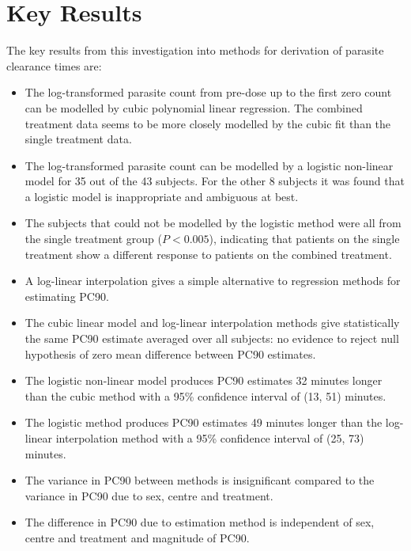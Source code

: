 \section{Key Results}
The key results from this investigation into methods for derivation of parasite clearance times are:
\begin{itemize}
\item The log-transformed parasite count from pre-dose up to the first zero count can be modelled by cubic polynomial linear regression. The combined treatment data seems to be more closely modelled by the cubic fit than the single treatment data.
\item The log-transformed parasite count can be modelled by a logistic non-linear model for 35 out of the 43 subjects. For the other 8 subjects it was found that a logistic model is inappropriate and ambiguous at best.
\item The subjects that could not be modelled by the logistic method were all from the single treatment group ($P<0.005$), indicating that patients on the single treatment show a different response to patients on the combined treatment.
\item A log-linear interpolation gives a simple alternative to regression methods for estimating PC90.
\item The cubic linear model and log-linear interpolation methods give statistically the same PC90 estimate averaged over all subjects: no evidence to reject null hypothesis of zero mean difference between PC90 estimates.
\item The logistic non-linear model produces PC90 estimates 32 minutes longer than the cubic method 
with a 95\% confidence interval of (13, 51) minutes.
\item The logistic method produces PC90 estimates 49 minutes longer than the log-linear interpolation method with a 95\% confidence interval of (25, 73) minutes.
\item The variance in PC90 between methods is insignificant compared to the variance in PC90 due to sex, centre and treatment.
\item The difference in PC90 due to estimation method is independent of sex, centre and treatment and magnitude of PC90. 
\end{itemize}

